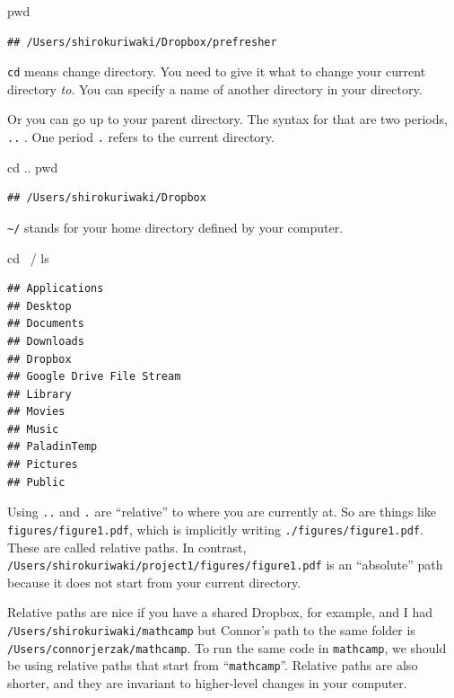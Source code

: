 \documentclass[]{book}
\newenvironment{Shaded}{\begin{snugshade}}{\end{snugshade}}
\newcommand{\FunctionTok}[1]{\textcolor[rgb]{0.00,0.00,0.00}{#1}}
\newcommand{\BuiltInTok}[1]{#1}
\newcommand{\NormalTok}[1]{#1}
\theoremstyle{definition}
\theoremstyle{definition}
\theoremstyle{definition}
\theoremstyle{remark}
\begin{document}
\begin{Shaded}
\begin{Highlighting}[]
\BuiltInTok{pwd}
\end{Highlighting}
\end{Shaded}

\begin{verbatim}
## /Users/shirokuriwaki/Dropbox/prefresher
\end{verbatim}

\texttt{cd} means change directory. You need to give it what to change
your current directory \emph{to}. You can specify a name of another
directory in your directory.

Or you can go up to your parent directory. The syntax for that are two
periods, \texttt{..} . One period \texttt{.} refers to the current
directory.

\begin{Shaded}
\begin{Highlighting}[]
\BuiltInTok{cd}\NormalTok{ ..}
\BuiltInTok{pwd}
\end{Highlighting}
\end{Shaded}

\begin{verbatim}
## /Users/shirokuriwaki/Dropbox
\end{verbatim}

\texttt{\textasciitilde{}/} stands for your home directory defined by
your computer.

\begin{Shaded}
\begin{Highlighting}[]
\BuiltInTok{cd}\NormalTok{ ~/}
\FunctionTok{ls}
\end{Highlighting}
\end{Shaded}

\begin{verbatim}
## Applications
## Desktop
## Documents
## Downloads
## Dropbox
## Google Drive File Stream
## Library
## Movies
## Music
## PaladinTemp
## Pictures
## Public
\end{verbatim}

Using \texttt{..} and \texttt{.} are ``relative'' to where you are
currently at. So are things like \texttt{figures/figure1.pdf}, which is
implicitly writing \texttt{./figures/figure1.pdf}. These are called
relative paths. In contrast,
\texttt{/Users/shirokuriwaki/project1/figures/figure1.pdf} is an
``absolute'' path because it does not start from your current directory.

Relative paths are nice if you have a shared Dropbox, for example, and I
had \texttt{/Users/shirokuriwaki/mathcamp} but Connor's path to the same
folder is \texttt{/Users/connorjerzak/mathcamp}. To run the same code in
\texttt{mathcamp}, we should be using relative paths that start from
``\texttt{mathcamp}''. Relative paths are also shorter, and they are
invariant to higher-level changes in your computer.
\end{document}
